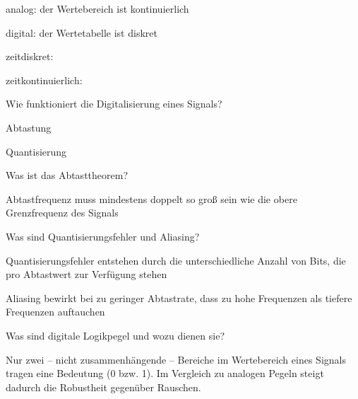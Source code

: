 \documentclass
[
  draft    = true,
  fontsize = 11pt,
  parskip  = half-,
  BCOR     = 0pt,
  DIV      = 11,
  ngerman,
  dvipsnames
]
{scrartcl}
\begin{document}
\begin{mytemize}
\begin{achim}
          \begin{mytemize}
            \item analog: der Wertebereich ist kontinuierlich
            \item digital: der Wertetabelle ist diskret
            \item zeitdiskret:
            \item zeitkontinuierlich:
          \end{mytemize}
        \end{achim}
  \item Wie funktioniert die Digitalisierung eines Signals? 
        \begin{achim}
          \begin{mytemize}
            \item Abtastung
            \item Quantisierung
          \end{mytemize}
        \end{achim}
  \item Was ist das Abtasttheorem? 
        \begin{achim}
          \begin{mytemize}
            \item Abtastfrequenz muss mindestens doppelt so groß sein wie die obere Grenzfrequenz des Signals
          \end{mytemize}
        \end{achim}
  \item Was sind Quantisierungsfehler und Aliasing? 
        \begin{achim}
          \begin{mytemize}
            \item Quantisierungsfehler entstehen durch die unterschiedliche Anzahl von Bits, die pro Abtastwert zur Verfügung stehen
            \item Aliasing bewirkt bei zu geringer Abtastrate, dass zu hohe Frequenzen als tiefere Frequenzen auftauchen
          \end{mytemize}
        \end{achim}
  \item Was sind digitale Logikpegel und wozu dienen sie? 
        \begin{achim}
          \begin{mytemize}
            \item Nur zwei -- nicht zusammenhängende -- Bereiche im Wertebereich eines Signals
                  tragen eine Bedeutung (0 bzw. 1). Im Vergleich zu analogen Pegeln steigt  
                  dadurch die Robustheit gegenüber Rauschen.
          \end{mytemize}
        \end{achim}
\end{mytemize}
\end{document}
